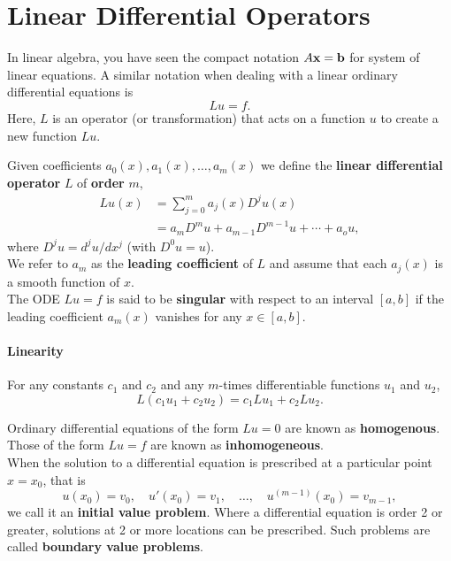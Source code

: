 \section{Linear Differential Operators}
In linear algebra, you have seen the compact notation \(A\bf{x} = \bf{b}\) for system of linear equations. A similar notation when dealing with a linear ordinary differential equations is
\[Lu = f.\]
Here, \(L\) is an operator (or transformation) that acts on a function \(u\) to create a new function \(Lu\).

Given coefficients \(a_0(x), a_1(x), \dots, a_m(x)\) we define the \textbf{linear differential operator} \(L\) of \textbf{order} \(m\),
\begin{align*}
    Lu(x) & = \sum_{j=0}^{m} a_j(x) D^ju(x)               \\
          & = a_mD^mu + a_{m-1}D^{m-1}u + \cdots + a_o u,
\end{align*}
where \(D^j u = d^j u / dx^j\) (with \(D^0 u = u\)). \\

We refer to \(a_m\) as the \textbf{leading coefficient} of \(L\) and assume that each \(a_j(x)\) is a smooth function of \(x\). \\

The ODE \(Lu = f\) is said to be \textbf{singular} with respect to an interval \([a, b]\) if the leading coefficient \(a_m(x)\) vanishes for any \(x \in [a, b]\). \\

\paragraph{Linearity} For any constants \(c_1\) and \(c_2\) and any \(m\)-times differentiable functions \(u_1\) and \(u_2\),
\[L(c_1u_1 + c_2u_2) = c_1 Lu_1 + c_2 Lu_2.\]

Ordinary differential equations of the form \(Lu = 0\) are known as \textbf{homogenous}. Those of the form \(Lu = f\) are known as \textbf{inhomogeneous}. \\

When the solution to a differential equation is prescribed at a particular point \(x = x_0\), that is
\[u(x_0) = v_0, \quad u'(x_0) = v_1, \quad \dots, \quad u^{(m - 1)}(x_0) = v_{m - 1},\]
we call it an \textbf{initial value problem}. Where a differential equation is order 2 or greater, solutions at 2 or more locations can be prescribed. Such problems are called \textbf{boundary value problems}. \\

